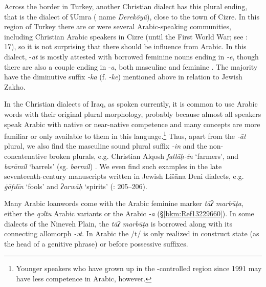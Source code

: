 \documentclass[output=paper]{langsci/langscibook}
\begin{document}
Across the border in Turkey, another Christian dialect has this plural ending, that is the dialect of ʕUmra ( name \textit{Dereköyü}), close to the town of Cizre. In this region of Turkey there are or were several Arabic-speaking communities, including Christian Arabic speakers in Cizre (until the First World War; see \citealt{Jastrow1978}: 17), so it is not surprising that there should be influence from Arabic. In this dialect, \nobreakdash-\textit{at} is mostly attested with borrowed feminine nouns ending in \textit{\nobreakdash-e}, though there are also a couple ending in \nobreakdash-\textit{a}, both masculine and feminine \citep[114]{Hobrack2000}. The majority have the  {diminutive} suffix \textit{\nobreakdash-ka} (f. \textit{\nobreakdash-ke}) mentioned above in relation to Jewish Zakho.

In the Christian dialects of Iraq, as spoken currently, it is common to use Arabic words with their original plural morphology, probably because almost all speakers speak Arabic with native or near-native competence and many concepts are more familiar or only available to them in this language.\footnote{Younger  speakers who have grown up in the -controlled region since 1991 may have less competence in Arabic, however.} Thus, apart from the \textit{\nobreakdash-āt} plural, we also find the masculine sound plural suffix \textit{{}-in} and the {non-concatenative} broken plurals, e.g. Christian Alqosh \textit{fallāḥ\nobreakdash-ín} ‘farmers’, and \textit{barāmíl} ‘barrels’ (sg. \textit{barmíl}) \citep[273]{Coghill2004}. We even find such examples in the late seventeenth-century manuscripts written in Jewish Lišāna Deni dialects, e.g. \textit{\.gāfılīn} ‘fools’ and \textit{ʔarwāḥ} ‘spirits’ (\citealt{Sabar1984}: 205–206).

Many Arabic {loanwords} come with the Arabic feminine marker \textit{tāʔ} \textit{marbūṭa}, either the \textit{qəltu} Arabic variants or the  Arabic \textit{\nobreakdash-a} (§\ref{bkm:Ref13229660}). In some dialects of the Nineveh Plain, the \textit{tāʔ} \textit{marbūṭa} is borrowed along with its connecting allomorph \textit{{}-ət}. In Arabic the /t/ is only realized in construct state (as the head of a genitive phrase) or before possessive suffixes.
\end{document}
